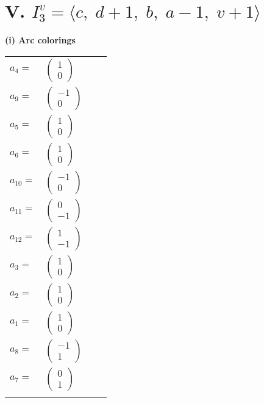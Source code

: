 \documentclass[1p]{elsarticle_modified}
\theoremstyle{definition}
\begin{document}
\centering \section*{V. $I^v_{3}= \langle c,\;d+1,\;b,\;a-1,\;v+1 \rangle$}
\flushleft \textbf{(i) Arc colorings}\\
\begin{tabular}{m{7pt} m{180pt} m{7pt} m{180pt} }
\flushright $a_{4}=$&$\begin{pmatrix}1\\0\end{pmatrix}$ \\
\flushright $a_{9}=$&$\begin{pmatrix}-1\\0\end{pmatrix}$ \\
\flushright $a_{5}=$&$\begin{pmatrix}1\\0\end{pmatrix}$ \\
\flushright $a_{6}=$&$\begin{pmatrix}1\\0\end{pmatrix}$ \\
\flushright $a_{10}=$&$\begin{pmatrix}-1\\0\end{pmatrix}$ \\
\flushright $a_{11}=$&$\begin{pmatrix}0\\-1\end{pmatrix}$ \\
\flushright $a_{12}=$&$\begin{pmatrix}1\\-1\end{pmatrix}$ \\
\flushright $a_{3}=$&$\begin{pmatrix}1\\0\end{pmatrix}$ \\
\flushright $a_{2}=$&$\begin{pmatrix}1\\0\end{pmatrix}$ \\
\flushright $a_{1}=$&$\begin{pmatrix}1\\0\end{pmatrix}$ \\
\flushright $a_{8}=$&$\begin{pmatrix}-1\\1\end{pmatrix}$ \\
\flushright $a_{7}=$&$\begin{pmatrix}0\\1\end{pmatrix}$\\&\end{tabular}
\end{document}
